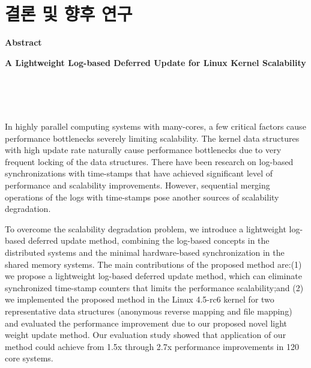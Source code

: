 \documentclass[doctor,korean,final]{kmu}
\begin{document}
\chapter{결론 및 향후 연구}\label{sec:concl}


%

%



\newpage
{}%
\hfill \break

\noindent
\Large{\textbf{Abstract}}

\noindent
\Large{\textbf{A Lightweight Log-based Deferred Update for Linux Kernel
Scalability}}

\normalsize{
\hfill \break
\begin{center}
\\
\\
\\
\end{center}
\hfill \break

In highly parallel computing systems with many-cores, a few critical factors
cause performance bottlenecks severely limiting scalability.
The kernel data structures with high update rate naturally cause performance
bottlenecks due to very frequent locking of the data structures.
There have been research on log-based synchronizations with time-stamps that
have achieved significant level of performance and scalability improvements.
However, sequential merging operations of the logs with time-stamps pose another
sources of scalability degradation.

To overcome the scalability degradation problem, we introduce a lightweight
log-based deferred update method, combining the log-based concepts in the
distributed systems and the minimal hardware-based synchronization in the
shared memory systems.
The main contributions of the proposed method are:(1) we propose a lightweight
log-based deferred update method, which can eliminate synchronized time-stamp
counters that limits the performance scalability;and (2) we implemented the
 proposed method in the Linux 4.5-rc6 kernel for two representative data
 structures (anonymous reverse mapping and file mapping) and evaluated the
performance improvement due to our proposed novel light weight update method.
Our evaluation study showed that application of our method could
achieve from 1.5x through 2.7x performance improvements in 120 core
systems.}

\end{document}
